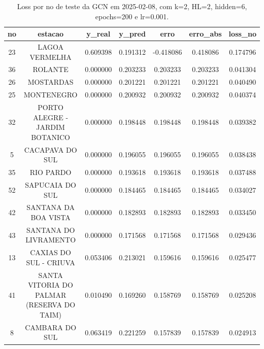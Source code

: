 \begin{table}[h]
\centering
\caption{Loss por no de teste da GCN em 2025-02-08, com k=2, HL=2, hidden=6, epochs=200 e lr=0.001.}
\label{tab:gcn_loss_k2_hl2_h6_e200_d20250208}
\begin{tabular}{ccccccc}
\toprule
no & estacao & y\_real & y\_pred & erro & erro\_abs & loss\_no \\
\midrule
23 & LAGOA VERMELHA & 0.609398 & 0.191312 & -0.418086 & 0.418086 & 0.174796 \\
36 & ROLANTE & 0.000000 & 0.203233 & 0.203233 & 0.203233 & 0.041304 \\
26 & MOSTARDAS & 0.000000 & 0.201221 & 0.201221 & 0.201221 & 0.040490 \\
25 & MONTENEGRO & 0.000000 & 0.200932 & 0.200932 & 0.200932 & 0.040374 \\
32 & PORTO ALEGRE - JARDIM BOTANICO & 0.000000 & 0.198448 & 0.198448 & 0.198448 & 0.039382 \\
5 & CACAPAVA DO SUL & 0.000000 & 0.196055 & 0.196055 & 0.196055 & 0.038438 \\
35 & RIO PARDO & 0.000000 & 0.193618 & 0.193618 & 0.193618 & 0.037488 \\
52 & SAPUCAIA DO SUL & 0.000000 & 0.184465 & 0.184465 & 0.184465 & 0.034027 \\
42 & SANTANA DA BOA VISTA & 0.000000 & 0.182893 & 0.182893 & 0.182893 & 0.033450 \\
43 & SANTANA DO LIVRAMENTO & 0.000000 & 0.171568 & 0.171568 & 0.171568 & 0.029436 \\
13 & CAXIAS DO SUL - CRIUVA & 0.053406 & 0.213021 & 0.159616 & 0.159616 & 0.025477 \\
41 & SANTA VITORIA DO PALMAR (RESERVA DO TAIM) & 0.010490 & 0.169260 & 0.158769 & 0.158769 & 0.025208 \\
8 & CAMBARA DO SUL & 0.063419 & 0.221259 & 0.157839 & 0.157839 & 0.024913 \\
\bottomrule
\end{tabular}
\end{table}
